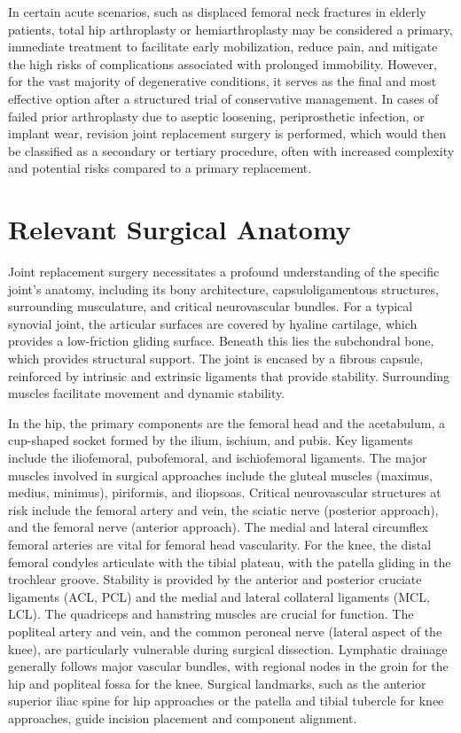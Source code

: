In certain acute scenarios, such as displaced femoral neck fractures in elderly patients, total hip arthroplasty or hemiarthroplasty may be considered a primary, immediate treatment to facilitate early mobilization, reduce pain, and mitigate the high risks of complications associated with prolonged immobility. However, for the vast majority of degenerative conditions, it serves as the final and most effective option after a structured trial of conservative management. In cases of failed prior arthroplasty due to aseptic loosening, periprosthetic infection, or implant wear, revision joint replacement surgery is performed, which would then be classified as a secondary or tertiary procedure, often with increased complexity and potential risks compared to a primary replacement.

\section*{Relevant Surgical Anatomy}
Joint replacement surgery necessitates a profound understanding of the specific joint's anatomy, including its bony architecture, capsuloligamentous structures, surrounding musculature, and critical neurovascular bundles. For a typical synovial joint, the articular surfaces are covered by hyaline cartilage, which provides a low-friction gliding surface. Beneath this lies the subchondral bone, which provides structural support. The joint is encased by a fibrous capsule, reinforced by intrinsic and extrinsic ligaments that provide stability. Surrounding muscles facilitate movement and dynamic stability.

In the hip, the primary components are the femoral head and the acetabulum, a cup-shaped socket formed by the ilium, ischium, and pubis. Key ligaments include the iliofemoral, pubofemoral, and ischiofemoral ligaments. The major muscles involved in surgical approaches include the gluteal muscles (maximus, medius, minimus), piriformis, and iliopsoas. Critical neurovascular structures at risk include the femoral artery and vein, the sciatic nerve (posterior approach), and the femoral nerve (anterior approach). The medial and lateral circumflex femoral arteries are vital for femoral head vascularity. For the knee, the distal femoral condyles articulate with the tibial plateau, with the patella gliding in the trochlear groove. Stability is provided by the anterior and posterior cruciate ligaments (ACL, PCL) and the medial and lateral collateral ligaments (MCL, LCL). The quadriceps and hamstring muscles are crucial for function. The popliteal artery and vein, and the common peroneal nerve (lateral aspect of the knee), are particularly vulnerable during surgical dissection. Lymphatic drainage generally follows major vascular bundles, with regional nodes in the groin for the hip and popliteal fossa for the knee. Surgical landmarks, such as the anterior superior iliac spine for hip approaches or the patella and tibial tubercle for knee approaches, guide incision placement and component alignment.


